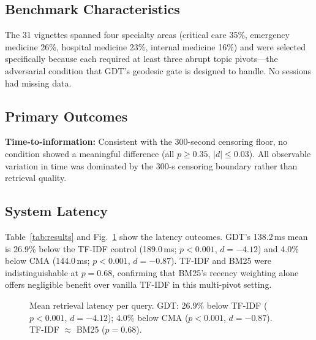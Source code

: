 \documentclass[review]{elsarticle}
\begin{document}
\subsection{Benchmark Characteristics}

The 31 vignettes spanned four specialty areas (critical care 35\%, emergency
medicine 26\%, hospital medicine 23\%, internal medicine 16\%) and were selected
specifically because each required at least three abrupt topic pivots---the
adversarial condition that GDT's geodesic gate is designed to handle. No sessions
had missing data.

\subsection{Primary Outcomes}

\textbf{Time-to-information:} Consistent with the 300-second censoring floor, no condition
showed a meaningful difference (all $p{\geq}0.35$, $|d|{\leq}0.03$). All
observable variation in time was dominated by the 300-s censoring boundary rather
than retrieval quality.

\subsection{System Latency}

Table~\ref{tab:results} and Fig.~\ref{fig:latency} show the latency outcomes.
GDT's 138.2\,ms mean is 26.9\% below the TF-IDF control (189.0\,ms;
$p{<}0.001$, $d{=}{-4.12}$) and 4.0\% below CMA (144.0\,ms; $p{<}0.001$,
$d{=}{-0.87}$). TF-IDF and BM25 were indistinguishable at $p{=}0.68$, confirming
that BM25's recency weighting alone offers negligible benefit over vanilla TF-IDF
in this multi-pivot setting.

\begin{figure}[!t]
  \centering
  \caption{Mean retrieval latency per query. GDT: 26.9\% below TF-IDF
    ($p{<}0.001$, $d{=}{-4.12}$); 4.0\% below CMA ($p{<}0.001$,
    $d{=}{-0.87}$). TF-IDF $\approx$ BM25 ($p{=}0.68$).}
  \label{fig:latency}
\end{figure}
\end{document}
